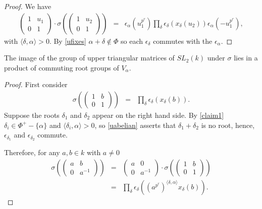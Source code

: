\begin{proof}
We have
\begin{eqnarray*}
\left(\begin{matrix}1 & u_1 \\ 0 & 1 \end{matrix}\right)
\cdot
\sigma\left(\left(\begin{matrix} 1 & u_2 \\ 0 & 1\end{matrix}\right)\right)
&=&
\epsilon_\alpha\left(u_1^{p^r}\right) \prod_\delta \epsilon_\delta\left(x_\delta\left(u_2\right)\right) \epsilon_\alpha\left(-u_1^{p^r}\right),
\end{eqnarray*}
with $\langle \delta, \alpha \rangle > 0$. By \ref{ufixes} $\alpha + \delta \notin \Phi$ so each $\epsilon_\delta$ commutes with the $\epsilon_\alpha$.
\end{proof}

\begin{corollary} The image of the group of upper triangular matrices of $SL_2(k)$ under $\sigma$ lies in a product of commuting root groups of $V_\alpha$.
\end{corollary}
\begin{proof}
First consider
\begin{eqnarray*}
\sigma\left(\left( \begin{matrix} 1 & b \\ 0 & 1 \end{matrix}\right)\right) &=& \prod_\delta \epsilon_\delta\left(x_\delta(b)\right).
\end{eqnarray*}
Suppose the roots $\delta_1$ and $\delta_2$ appear on the right hand side. By \ref{claim1} $\delta_i \in \Phi^+ - \{\alpha\}$ and $\langle \delta_i, \alpha \rangle > 0$, so \ref{uabelian} asserts that $\delta_1 + \delta_2$ is no root, hence, $\epsilon_{\delta_1}$ and $\epsilon_{\delta_2}$ commute. 

Therefore, for any $a, b\in k$ with $a\neq 0$
\begin{eqnarray*}
\sigma\left(\left(\begin{matrix} a & b \\ 0 & a^{-1}\end{matrix}\right)\right) 
&=& \left(\begin{matrix} a & 0 \\ 0 & a^{-1}\end{matrix} \right) \cdot
\sigma\left(\left(\begin{matrix} 1 & b \\ 0 & 1\end{matrix}\right)\right) \\
&=& \prod_\delta \epsilon_\delta\left((a^{p^r})^{\langle \delta, \alpha \rangle}x_\delta\left(b\right)\right).
\end{eqnarray*}
\end{proof}

